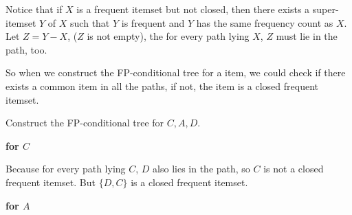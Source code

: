 \documentclass[en,black,normal,10pt]{elegantnote}
\begin{document}
Notice that if $X$ is a frequent itemset but not closed, then there exists a super-itemset $Y$ of $X$ such that $Y$ is frequent and $Y$ has the same frequency count as $X$.
Let $Z = Y - X$, ($Z$ is not empty), the for every path lying $X$, $Z$ must lie in the path, too.

So when we construct the FP-conditional tree for a item, we could check if there exists a common item in all the paths, if not, the item is a closed frequent itemset.

Construct the FP-conditional tree for $C, A, D$.

\textbf{for $C$}


Because for every path lying $C$, $D$ also lies in the path, so $C$ is not a closed frequent itemset. 
But $\{D, C\}$ is a closed frequent itemset.

\textbf{for $A$}
\end{document}
